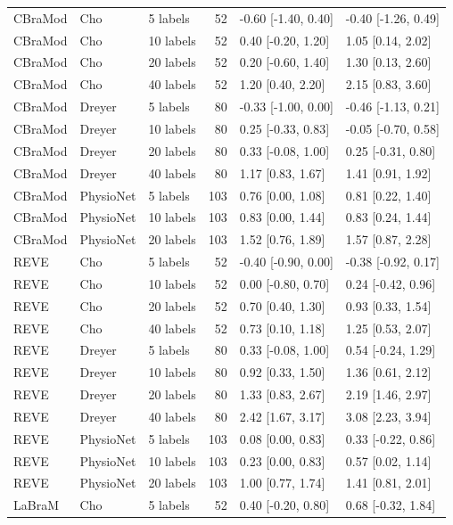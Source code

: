 \begin{longtable}{p{.65in}p{.60in}p{1.9in}rp{1.20in}p{1.20in}}
CBraMod & Cho & 5 labels & 52 & -0.60 [-1.40, 0.40] & -0.40 [-1.26, 0.49] \\
CBraMod & Cho & 10 labels & 52 & 0.40 [-0.20, 1.20] & 1.05 [0.14, 2.02] \\
CBraMod & Cho & 20 labels & 52 & 0.20 [-0.60, 1.40] & 1.30 [0.13, 2.60] \\
CBraMod & Cho & 40 labels & 52 & 1.20 [0.40, 2.20] & 2.15 [0.83, 3.60] \\
CBraMod & Dreyer & 5 labels & 80 & -0.33 [-1.00, 0.00] & -0.46 [-1.13, 0.21] \\
CBraMod & Dreyer & 10 labels & 80 & 0.25 [-0.33, 0.83] & -0.05 [-0.70, 0.58] \\
CBraMod & Dreyer & 20 labels & 80 & 0.33 [-0.08, 1.00] & 0.25 [-0.31, 0.80] \\
CBraMod & Dreyer & 40 labels & 80 & 1.17 [0.83, 1.67] & 1.41 [0.91, 1.92] \\
CBraMod & PhysioNet & 5 labels & 103 & 0.76 [0.00, 1.08] & 0.81 [0.22, 1.40] \\
CBraMod & PhysioNet & 10 labels & 103 & 0.83 [0.00, 1.44] & 0.83 [0.24, 1.44] \\
CBraMod & PhysioNet & 20 labels & 103 & 1.52 [0.76, 1.89] & 1.57 [0.87, 2.28] \\
REVE & Cho & 5 labels & 52 & -0.40 [-0.90, 0.00] & -0.38 [-0.92, 0.17] \\
REVE & Cho & 10 labels & 52 & 0.00 [-0.80, 0.70] & 0.24 [-0.42, 0.96] \\
REVE & Cho & 20 labels & 52 & 0.70 [0.40, 1.30] & 0.93 [0.33, 1.54] \\
REVE & Cho & 40 labels & 52 & 0.73 [0.10, 1.18] & 1.25 [0.53, 2.07] \\
REVE & Dreyer & 5 labels & 80 & 0.33 [-0.08, 1.00] & 0.54 [-0.24, 1.29] \\
REVE & Dreyer & 10 labels & 80 & 0.92 [0.33, 1.50] & 1.36 [0.61, 2.12] \\
REVE & Dreyer & 20 labels & 80 & 1.33 [0.83, 2.67] & 2.19 [1.46, 2.97] \\
REVE & Dreyer & 40 labels & 80 & 2.42 [1.67, 3.17] & 3.08 [2.23, 3.94] \\
REVE & PhysioNet & 5 labels & 103 & 0.08 [0.00, 0.83] & 0.33 [-0.22, 0.86] \\
REVE & PhysioNet & 10 labels & 103 & 0.23 [0.00, 0.83] & 0.57 [0.02, 1.14] \\
REVE & PhysioNet & 20 labels & 103 & 1.00 [0.77, 1.74] & 1.41 [0.81, 2.01] \\
LaBraM & Cho & 5 labels & 52 & 0.40 [-0.20, 0.80] & 0.68 [-0.32, 1.84] \\

\end{longtable}
